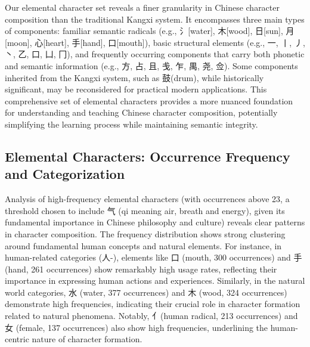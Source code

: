 \documentclass[11pt,letterpaper]{article}
\begin{document}
Our elemental character set reveals a finer granularity in Chinese
character composition than the traditional Kangxi system. It encompasses
three main types of components: familiar semantic radicals (e.g.,
氵{[}water{]}, 木{[}wood{]}, 日{[}sun{]}, 月{[}moon{]}, 心{[}heart{]},
手{[}hand{]}, 口{[}mouth{]}), basic structural elements (e.g., 一, 丨,
丿, 丶, 乙, 口, 凵, 冂), and frequently occurring components that carry
both phonetic and semantic information (e.g., 方, 占, 且, 戋, 乍, 禺,
尧, 佥). Some components inherited from the Kangxi system, such as
鼓(drum), while historically significant, may be reconsidered for
practical modern applications. This comprehensive set of elemental
characters provides a more nuanced foundation for understanding and
teaching Chinese character composition, potentially simplifying the
learning process while maintaining semantic integrity.

\subsection{Elemental Characters: Occurrence Frequency and
Categorization}\label{elemental-characters-occurrence-frequency-and-categorization}

Analysis of high-frequency elemental characters (with occurrences above
23, a threshold chosen to include 气 (qi meaning air, breath and energy), 
given its fundamental importance in Chinese philosophy and culture) reveals clear
patterns in character composition. The frequency distribution shows
strong clustering around fundamental human concepts and natural
elements. For instance, in human-related categories (人-), elements like
口 (mouth, 300 occurrences) and 手 (hand, 261 occurrences) show
remarkably high usage rates, reflecting their importance in expressing
human actions and experiences. Similarly, in the natural world
categories, 水 (water, 377 occurrences) and 木 (wood, 324 occurrences)
demonstrate high frequencies, indicating their crucial role in character
formation related to natural phenomena. Notably, 亻(human radical, 213
occurrences) and 女 (female, 137 occurrences) also show high
frequencies, underlining the human-centric nature of character
formation.
\end{document}
